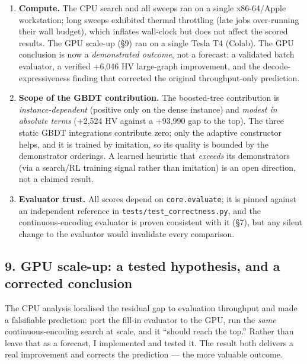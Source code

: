 \documentclass[
  11pt,
]{article}
\begin{document}
\begin{enumerate}
  \textbf{Leaderboard reference.} The ``\% of top'' figures are against
  the best scores \emph{observed} on the public leaderboard at the time
  of writing; leaderboards drift, so these should be re-verified against
  the live board before any external claim.
\item
  \textbf{Compute.} The CPU search and all sweeps ran on a single
  x86-64/Apple workstation; long sweeps exhibited thermal throttling
  (late jobs over-running their wall budget), which inflates wall-clock
  but does not affect the scored results. The GPU scale-up (§9) ran on a
  single Tesla T4 (Colab). The GPU conclusion is now a
  \emph{demonstrated outcome}, not a forecast: a validated batch
  evaluator, a verified +6,046 HV large-graph improvement, and the
  decode-expressiveness finding that corrected the original
  throughput-only prediction.
\item
  \textbf{Scope of the GBDT contribution.} The boosted-tree contribution
  is \emph{instance-dependent} (positive only on the dense instance) and
  \emph{modest in absolute terms} (+2,524 HV against a +93,990 gap to
  the top). The three static GBDT integrations contribute zero; only the
  adaptive constructor helps, and it is trained by imitation, so its
  quality is bounded by the demonstrator orderings. A learned heuristic
  that \emph{exceeds} its demonstrators (via a search/RL training signal
  rather than imitation) is an open direction, not a claimed result.
\item
  \textbf{Evaluator trust.} All scores depend on \texttt{core.evaluate};
  it is pinned against an independent reference in
  \texttt{tests/test\_correctness.py}, and the continuous-encoding
  evaluator is proven consistent with it (§7), but any silent change to
  the evaluator would invalidate every comparison.
\end{enumerate}

\hypertarget{gpu-scale-up-a-tested-hypothesis-and-a-corrected-conclusion}{%
\subsection{9. GPU scale-up: a tested hypothesis, and a corrected
conclusion}\label{gpu-scale-up-a-tested-hypothesis-and-a-corrected-conclusion}}

The CPU analysis localised the residual gap to evaluation throughput and
made a falsifiable prediction: port the fill-in evaluator to the GPU,
run the \emph{same} continuous-encoding search at scale, and it ``should
reach the top.'' Rather than leave that as a forecast, I implemented and
tested it. The result both delivers a real improvement and corrects the
prediction --- the more valuable outcome.
\end{document}
